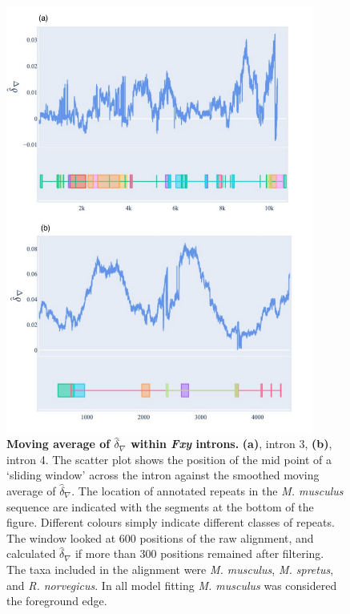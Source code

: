\begin{figure}[htbp]
\centering
\includegraphics[width=0.9\textwidth]{figures/plots/rodent/dconv-intron3_4.pdf}
\caption{\textbf{Moving average of $\hat\delta_\nabla$ within \textit{Fxy} introns.}
\textbf{(a)}, intron 3, \textbf{(b)}, intron 4. The scatter plot shows the position of the mid point of a `sliding window' across the intron against the smoothed moving average of $\hat\delta_\nabla$. The location of annotated repeats in the \textit{M. musculus} sequence are indicated with the segments at the bottom of the figure. Different colours simply indicate different classes of repeats. The window looked at 600 positions of the raw alignment, and calculated $\hat\delta_\nabla$ if more than 300 positions remained after filtering. The taxa included in the alignment were \textit{M. musculus}, \textit{M. spretus}, and \textit{R. norvegicus}. In all model fitting \textit{M. musculus} was considered the foreground edge. }
\label{fig:rodent/d-conv/intron3_4}
\end{figure}